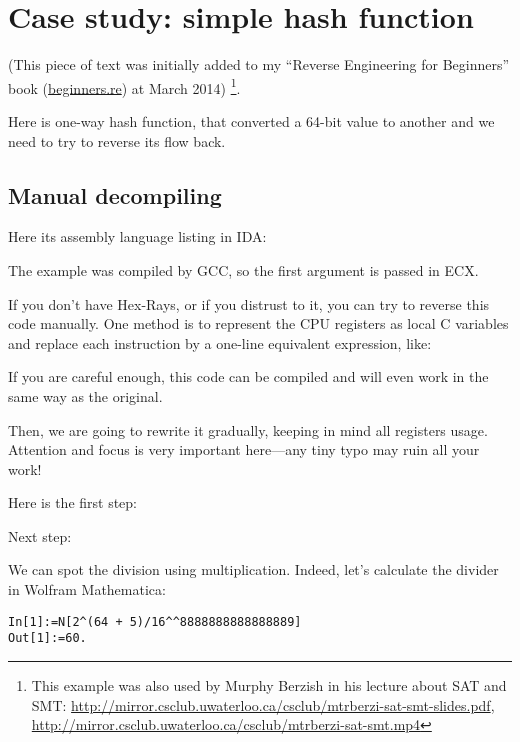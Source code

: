 \section{Case study: simple hash function}

(This piece of text was initially added to my ``Reverse Engineering for Beginners'' book (\url{beginners.re}) at March 2014)
\footnote{This example was also used by Murphy Berzish in his lecture about \ac{SAT} and \ac{SMT}:
\url{http://mirror.csclub.uwaterloo.ca/csclub/mtrberzi-sat-smt-slides.pdf},
\url{http://mirror.csclub.uwaterloo.ca/csclub/mtrberzi-sat-smt.mp4}}.

Here is one-way hash function, that converted a 64-bit value to another and we need to try to reverse its flow back.

\subsection{Manual decompiling}

Here its assembly language listing in IDA:



The example was compiled by GCC, so the first argument is passed in ECX.

If you don't have Hex-Rays, or if you distrust to it, you can try to reverse this code manually.
One method is to represent the CPU registers as local C variables and replace each instruction by
a one-line equivalent expression, like:



If you are careful enough, this code can be compiled and will even work in the same way as the original.

Then, we are going to rewrite it gradually, keeping in mind all registers usage.
Attention and focus is very important here---any tiny typo may ruin all your work!

Here is the first step:



Next step:



We can spot the division using multiplication.
Indeed, let's calculate the divider in Wolfram Mathematica:

\begin{lstlisting}[caption=Wolfram Mathematica]
In[1]:=N[2^(64 + 5)/16^^8888888888888889]
Out[1]:=60.
\end{lstlisting}

